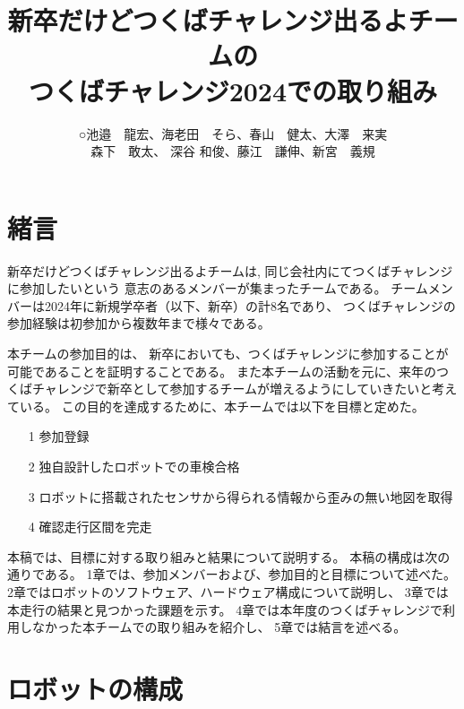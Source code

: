 \documentclass[twocolumn,9pt]{jsproceedings}
\title{新卒だけどつくばチャレンジ出るよチームの\\つくばチャレンジ2024での取り組み}
\author{○池邉　龍宏\authorrefmark{1}、海老田　そら\authorrefmark{1}、春山　健太\authorrefmark{1}、大澤　来実\authorrefmark{1}\\森下　敢太\authorrefmark{1}、
深谷 和俊\authorrefmark{1}、藤江　謙伸\authorrefmark{1}、新宮　義規\authorrefmark{1}}
\affiliation{新卒だけどつくばチャレンジ出るよ}
\begin{document}
\maketitle


\section{緒言}

新卒だけどつくばチャレンジ出るよチームは,
同じ会社内にてつくばチャレンジに参加したいという
意志のあるメンバーが集まったチームである。
チームメンバーは2024年に新規学卒者（以下、新卒）の計8名であり、
つくばチャレンジの参加経験は初参加から複数年まで様々である。

本チームの参加目的は、
新卒においても、つくばチャレンジに参加することが可能であることを証明することである。
また本チームの活動を元に、来年のつくばチャレンジで新卒として参加するチームが増えるようにしていきたいと考えている。
この目的を達成するために、本チームでは以下を目標と定めた。
\begin{itemize}
  \item[1] 参加登録
  \item[2] 独自設計したロボットでの車検合格
  \item[3] ロボットに搭載されたセンサから得られる情報から歪みの無い地図を取得
  \item[4] 確認走行区間を完走
\end{itemize}


本稿では、目標に対する取り組みと結果について説明する。
本稿の構成は次の通りである。
1章では、参加メンバーおよび、参加目的と目標について述べた。
2章ではロボットのソフトウェア、ハードウェア構成について説明し、
3章では本走行の結果と見つかった課題を示す。
4章では本年度のつくばチャレンジで利用しなかった本チームでの取り組みを紹介し、
5章では結言を述べる。

\section{ロボットの構成}
\end{document}
